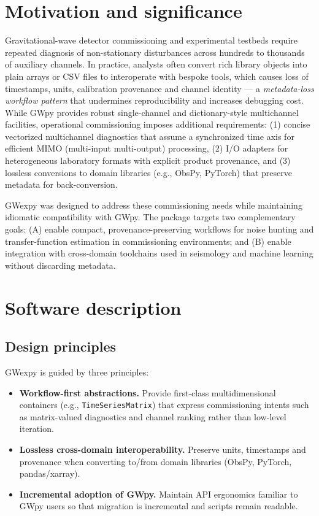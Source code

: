 \documentclass[preprint,12pt,a4paper]{elsarticle}
\begin{document}
\section{Motivation and significance}
Gravitational-wave detector commissioning and experimental testbeds require repeated diagnosis of non-stationary disturbances across hundreds to thousands of auxiliary channels.  In practice, analysts often convert rich library objects into plain arrays or CSV files to interoperate with bespoke tools, which causes loss of timestamps, units, calibration provenance and channel identity — a \emph{metadata-loss workflow pattern} that undermines reproducibility and increases debugging cost.  While GWpy provides robust single-channel and dictionary-style multichannel facilities\cite{gwpy}, operational commissioning imposes additional requirements: (1) concise vectorized multichannel diagnostics that assume a synchronized time axis for efficient MIMO (multi-input multi-output) processing, (2) I/O adapters for heterogeneous laboratory formats with explicit product provenance, and (3) lossless conversions to domain libraries (e.g., ObsPy, PyTorch) that preserve metadata for back-conversion.

GWexpy was designed to address these commissioning needs while maintaining idiomatic compatibility with GWpy.  The package targets two complementary goals: (A) enable compact, provenance-preserving workflows for noise hunting and transfer-function estimation in commissioning environments; and (B) enable integration with cross-domain toolchains used in seismology and machine learning without discarding metadata.

\section{Software description}

\subsection{Design principles}
GWexpy is guided by three principles:

\begin{itemize}
  \item \textbf{Workflow-first abstractions.} Provide first-class multidimensional containers (e.g., \texttt{TimeSeriesMatrix}) that express commissioning intents such as matrix-valued diagnostics and channel ranking rather than low-level iteration.
  \item \textbf{Lossless cross-domain interoperability.} Preserve units, timestamps and provenance when converting to/from domain libraries (ObsPy, PyTorch, pandas/xarray).
  \item \textbf{Incremental adoption of GWpy.} Maintain API ergonomics familiar to GWpy users so that migration is incremental and scripts remain readable.
\end{itemize}
\end{document}
